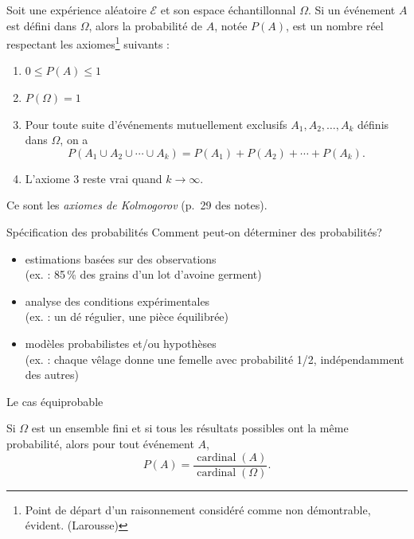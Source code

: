 \documentclass{BeamerTemplate}
\begin{document}
\begin{frame}[t]
  \begin{defn}
    Soit une expérience aléatoire $\mathcal{E}$ et son espace échantillonnal
    $\Omega$. Si un événement $A$ est défini dans $\Omega$, alors la
    \alert{probabilité de $A$, notée $P(A)$}, est un nombre réel respectant les
    axiomes\footnote{Point de départ d'un raisonnement considéré comme non
    démontrable, évident. (Larousse)} suivants :
    \begin{enumerate}
      \item $0 \le P(A) \le 1$
      \item $P(\Omega) = 1$
      \item Pour toute suite d'événements \alert{mutuellement exclusifs}
        $A_1, A_2, \ldots, A_k$ définis dans $\Omega$, on a
        \[ P(A_1 \cup A_2 \cup \cdots \cup A_k) = P(A_1) + P(A_2) + \cdots + P(A_k). \]
      \item L'axiome 3 reste vrai quand $k \to \infty$.
    \end{enumerate}
  \end{defn}
  Ce sont les \emph{axiomes de Kolmogorov} (p.~29 des notes).
\end{frame}

\begin{frame}[t]{Spécification des probabilités}
  Comment peut-on déterminer des probabilités?

  \medskip
  \begin{itemize}\itemsep 8mm
    \item<1-> estimations basées sur des observations\\
      {\small\color{gray} (ex. : 85\,\% des grains d'un lot d'avoine germent)}
    \item<2-> analyse des conditions expérimentales\\
      {\small\color{gray} (ex. : un dé régulier, une pièce équilibrée)}
    \item<3-> modèles probabilistes et/ou hypothèses\\
      {\small\color{gray} (ex. : chaque vêlage donne une femelle avec probabilité 1/2,
      indépendamment des autres)}
  \end{itemize}
\end{frame}

\begin{frame}[t]{Le cas équiprobable}
  \begin{prp}
    Si $\Omega$ est un ensemble fini et si tous les résultats possibles ont la
    même probabilité, alors pour tout événement $A$,
    \[ P(A) = \frac{\operatorname{cardinal}(A)}{\operatorname{cardinal}(\Omega)}. \]
  \end{prp}

\end{frame}
\end{document}
